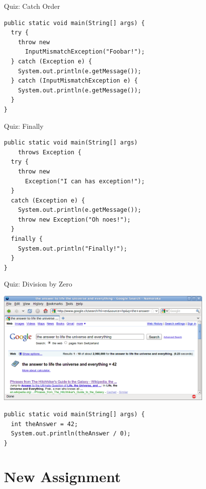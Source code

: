 \begin{frame}[fragile]{Quiz: Catch Order}
  \begin{lstlisting}
public static void main(String[] args) {
  try {
    throw new 
      InputMismatchException("Foobar!");
  } catch (Exception e) {
    System.out.println(e.getMessage());
  } catch (InputMismatchException e) {
    System.out.println(e.getMessage());
  }
}
  \end{lstlisting}
\end{frame}

\begin{frame}[fragile]{Quiz: Finally}
  \begin{lstlisting}
public static void main(String[] args) 
    throws Exception {
  try {
    throw new 
      Exception("I can has exception!");
  } 
  catch (Exception e) {
    System.out.println(e.getMessage());
    throw new Exception("Oh noes!");
  } 
  finally {
    System.out.println("Finally!");
  }
}
  \end{lstlisting}
\end{frame}

\begin{frame}[fragile]{Quiz: Division by Zero}
  \begin{center}
    \includegraphics[width=0.8\textwidth]{figures/42}
  \end{center}


  \begin{lstlisting}
public static void main(String[] args) {
  int theAnswer = 42;
  System.out.println(theAnswer / 0);
}
  \end{lstlisting}
\end{frame}


\section{New Assignment}

